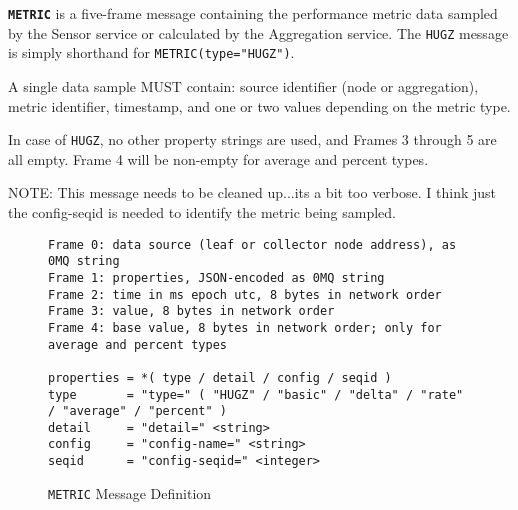 \textbf{\texttt{METRIC}} is a five-frame message containing the performance metric data sampled by the Sensor service or
calculated by the Aggregation service. The \texttt{HUGZ} message is simply shorthand for \texttt{METRIC(type="HUGZ")}.

A single data sample MUST contain: source identifier (node or aggregation), metric identifier, timestamp, and one or two
values depending on the metric type.

In case of \texttt{HUGZ}, no other property strings are used, and Frames 3 through 5 are all empty. Frame 4 will be
non-empty for average and percent types.

NOTE: This message needs to be cleaned up...its a bit too verbose. I think just the config-seqid is needed to identify
      the metric being sampled.

\begin{figure}[H]
\vspace{+10pt}
\begin{verbatim}
Frame 0: data source (leaf or collector node address), as 0MQ string
Frame 1: properties, JSON-encoded as 0MQ string
Frame 2: time in ms epoch utc, 8 bytes in network order
Frame 3: value, 8 bytes in network order
Frame 4: base value, 8 bytes in network order; only for average and percent types

properties = *( type / detail / config / seqid )
type       = "type=" ( "HUGZ" / "basic" / "delta" / "rate" / "average" / "percent" )
detail     = "detail=" <string>
config     = "config-name=" <string>
seqid      = "config-seqid=" <integer>
\end{verbatim}
\vspace{-20pt}
\caption{\texttt{METRIC} Message Definition}
\label{fig:message_metric}
\end{figure}
